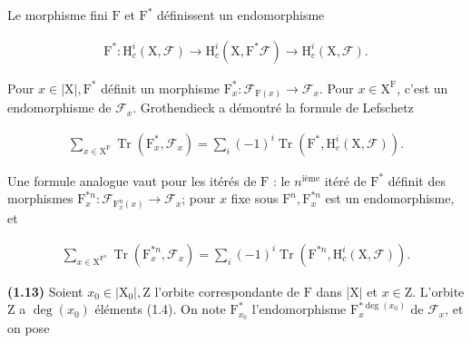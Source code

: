 \documentclass[10pt,leqno]{article}
\begin{document}
\noindent Le morphisme fini \(\mathrm{F}\) et \(\mathrm{F}^{*}\) définissent un endomorphisme\par

\begin{equation*}\begin{gathered}\mathrm{F}^{*} : \mathrm{H}_{c}^{i}(\mathrm{X},\mathcal{F} ) \longrightarrow  \mathrm{H}_{c}^{i}(\mathrm{X},\mathrm{F}^{*}\mathcal{F} ) \longrightarrow  \mathrm{H}_{c}^{i}(\mathrm{X},\mathcal{F} ).\end{gathered}\end{equation*}

\noindent Pour \(x\in |\mathrm{X}|, \mathrm{F}^{*}\) définit un morphisme \(\mathrm{F}_{x}^{*} : \mathcal{F} _{\mathrm{F}(x)}\longrightarrow \mathcal{F} _{x}\). Pour \(x\in \mathrm{X}^{\mathrm{F}}\), c’est un endomorphisme de \(\mathcal{F} _{x}\). Grothendieck a démontré la formule de Lefschetz\par

\begin{equation*}\begin{gathered}\sum _{x\in \mathrm{X}^{\mathrm{F}}} \operatorname{Tr}(\mathrm{F}_{x}^{*},\mathcal{F} _{x}) = \sum _{i} (- 1)^{i} \operatorname{Tr}(\mathrm{F}^{*},\mathrm{H}_{c}^{i}(\mathrm{X},\mathcal{F} )).\end{gathered}\end{equation*}

\noindent Une formule analogue vaut pour les itérés de \(\mathrm{F}\) : le \(n^{\mathrm{ième}}\) itéré de \(\mathrm{F}^{*}\) définit des morphismes \(\mathrm{F}_{x}^{*n} : \mathcal{F} _{\mathrm{F}_{x}^{n}(x)}\longrightarrow \mathcal{F} _{x}\); pour \(x\) fixe sous \(\mathrm{F}^{n}, \mathrm{F}_{x}^{*n}\) est un endomorphisme, et\par

\begin{equation*}\begin{gathered}\sum _{x\in \mathrm{X}^{\mathrm{F}^{n}}} \operatorname{Tr}(\mathrm{F}_{x}^{*n},\mathcal{F} _{x}) = \sum _{i} (- 1)^{i} \operatorname{Tr}(\mathrm{F}^{*n},\mathrm{H}_{c}^{i}(\mathrm{X},\mathcal{F} )).\end{gathered}\tag{1.12.1}\end{equation*}

\noindent \textbf{(1.13)} Soient \(x_{0}\in |\mathrm{X}_{0}|, \mathrm{Z}\) l’orbite correspondante de \(\mathrm{F}\) dans |\(\mathrm{X}|\) et \(x\in \mathrm{Z}\). L’orbite \(\mathrm{Z}\) a \(\operatorname{deg}(x_{0})\) éléments (1.4). On note \(\mathrm{F}_{x_{0}}^{*}\) l’endomorphisme \(\mathrm{F}_{x}^{*\operatorname{deg}(x_{0})}\) de \(\mathcal{F} _{x}\), et on pose\par
\end{document}
